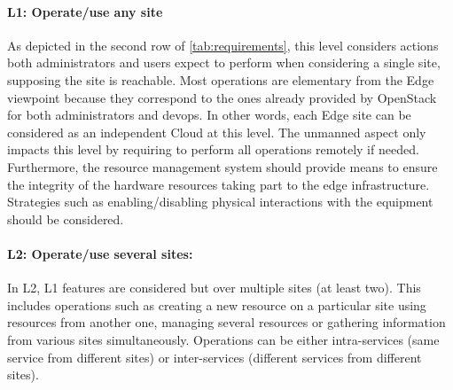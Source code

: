 \paragraph{L1: Operate/use any site}
As depicted in the second row of \cref{tab:requirements}, this level
considers actions both administrators and users expect to perform
when considering a single site, supposing the site is reachable.
%
Most operations are elementary from the Edge viewpoint because they
correspond to the ones already provided by OpenStack for both administrators and devops.  In other words,
each Edge site can be considered as an independent Cloud at this
level. The unmanned aspect only impacts this level by requiring to perform all operations
remotely if needed.
Furthermore, the resource management system should provide means to
ensure the integrity of the hardware resources taking part to the edge
infrastructure. Strategies such as enabling/disabling physical
interactions with the equipment should be considered.




\paragraph{L2: Operate/use several sites:}

In L2, L1 features are considered but over multiple sites (at least
two).  This includes operations such as creating a new resource on a
particular site using resources from another one, managing several
resources or gathering information from various sites simultaneously.
Operations can be either intra-services (same service from different sites) or
inter-services (different services from different sites).

